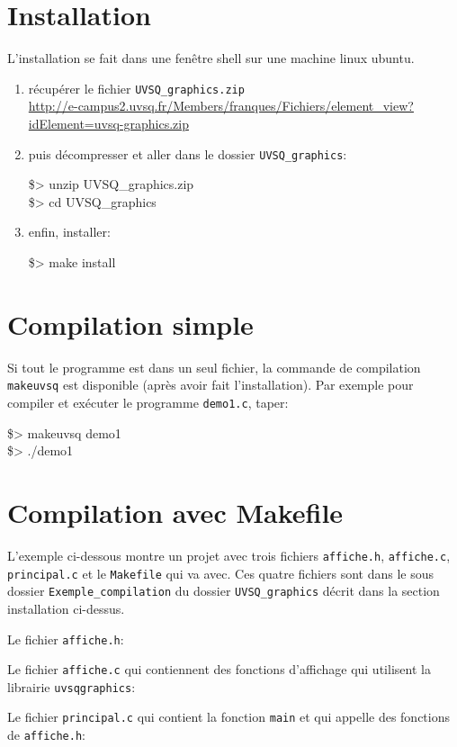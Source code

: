 \documentclass{report}
\newcommand\code[1]{
\begin{mdframed}[linecolor=purple,backgroundcolor=blue!10]
{\tt
#1
}
\end{mdframed}
}
\begin{document}
\section{Installation}
L'installation se fait dans une fenêtre shell sur une machine linux ubuntu.
\begin{enumerate}
\item récupérer le fichier \texttt{UVSQ\_graphics.zip}\\
\hspace*{-5mm}\url{http://e-campus2.uvsq.fr/Members/franques/Fichiers/element_view?idElement=uvsq-graphics.zip}
\item puis décompresser et aller dans le dossier \texttt{UVSQ\_graphics}:
\code{
\$> unzip UVSQ\_graphics.zip\\
\$> cd UVSQ\_graphics
}
\item enfin, installer:
\code{
\$> make install
}
\end{enumerate}

\section{Compilation simple}
Si tout le programme est dans un seul fichier, la commande de compilation \texttt{makeuvsq} est disponible (après avoir fait l'installation).
Par exemple pour compiler et exécuter le programme \texttt{demo1.c}, taper:
\code{
\$> makeuvsq demo1\\
\$> ./demo1
}

\section{Compilation avec Makefile}
L'exemple ci-dessous montre un projet avec trois fichiers \texttt{affiche.h}, \texttt{affiche.c}, \texttt{principal.c} 
et le \texttt{Makefile} qui va avec. Ces quatre fichiers sont dans le sous dossier \texttt{Exemple\_compilation} du dossier \texttt{UVSQ\_graphics} décrit dans la section installation ci-dessus.

\vspace{5mm}
Le fichier \texttt{affiche.h}:
\code{  }

Le fichier \texttt{affiche.c} qui contiennent des fonctions d'affichage qui utilisent la librairie \texttt{uvsqgraphics}:\code{  }

Le fichier \texttt{principal.c} qui contient la fonction \texttt{main} et qui appelle des fonctions de \texttt{affiche.h}:
\code{  }
\end{document}
